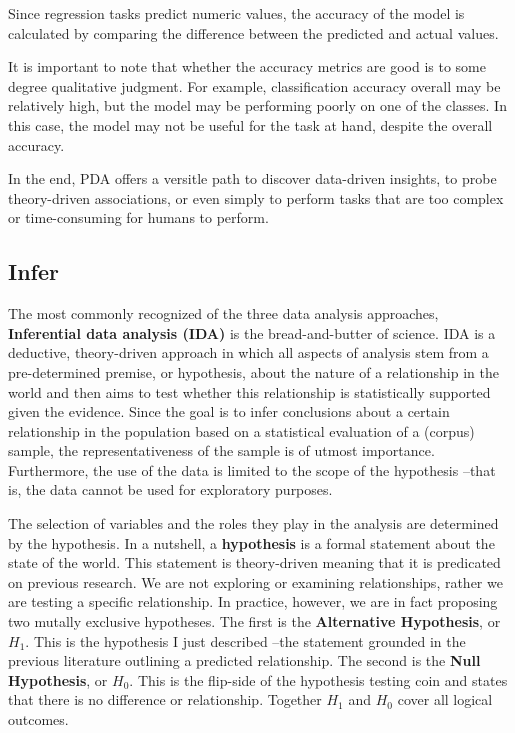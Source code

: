 \documentclass[
  letterpaper,
  DIV=11,
  numbers=noendperiod]{scrreport}
\theoremstyle{definition}
\theoremstyle{remark}
\begin{document}
Since regression tasks predict numeric values, the accuracy of the model
is calculated by comparing the difference between the predicted and
actual values.

It is important to note that whether the accuracy metrics are good is to
some degree qualitative judgment. For example, classification accuracy
overall may be relatively high, but the model may be performing poorly
on one of the classes. In this case, the model may not be useful for the
task at hand, despite the overall accuracy.

In the end, PDA offers a versitle path to discover data-driven insights,
to probe theory-driven associations, or even simply to perform tasks
that are too complex or time-consuming for humans to perform.

\hypertarget{sec-aa-infer}{%
\subsection{Infer}\label{sec-aa-infer}}

The most commonly recognized of the three data analysis approaches,
\textbf{Inferential data analysis (IDA)} is the bread-and-butter of
science. IDA is a deductive, theory-driven approach in which all aspects
of analysis stem from a pre-determined premise, or hypothesis, about the
nature of a relationship in the world and then aims to test whether this
relationship is statistically supported given the evidence. Since the
goal is to infer conclusions about a certain relationship in the
population based on a statistical evaluation of a (corpus) sample, the
representativeness of the sample is of utmost importance. Furthermore,
the use of the data is limited to the scope of the hypothesis --that is,
the data cannot be used for exploratory purposes.

The selection of variables and the roles they play in the analysis are
determined by the hypothesis. In a nutshell, a \textbf{hypothesis} is a
formal statement about the state of the world. This statement is
theory-driven meaning that it is predicated on previous research. We are
not exploring or examining relationships, rather we are testing a
specific relationship. In practice, however, we are in fact proposing
two mutally exclusive hypotheses. The first is the \textbf{Alternative
Hypothesis}, or \(H_1\). This is the hypothesis I just described --the
statement grounded in the previous literature outlining a predicted
relationship. The second is the \textbf{Null Hypothesis}, or \(H_0\).
This is the flip-side of the hypothesis testing coin and states that
there is no difference or relationship. Together \(H_1\) and \(H_0\)
cover all logical outcomes.
\end{document}
